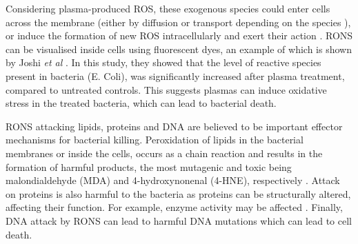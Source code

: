\documentclass[11pt, oneside]{article}   	%
\begin{document}
%
Considering plasma-produced ROS, these exogenous species could enter cells across the membrane (either by diffusion or transport depending on the species \cite{Bienert2006membrane}), or induce the formation of new ROS intracellularly and exert their action \cite{Haertel2014nonthermal}.
RONS can be visualised inside cells using fluorescent dyes, an example of which is shown by Joshi \textit{et al} \cite{Joshi2011nonthermal}.
In this study, they showed that the level of reactive species present in bacteria (E. Coli), was significantly increased after plasma treatment, compared to untreated controls.
This suggests plasmas can induce oxidative stress in the treated bacteria, which can lead to bacterial death.

RONS attacking lipids, proteins and DNA are believed to be important effector mechanisms for bacterial killing.
Peroxidation of lipids in the bacterial membranes or inside the cells, occurs as a chain reaction and results in the formation of harmful products, the most mutagenic and toxic being malondialdehyde (MDA) and 4-hydroxynonenal (4-HNE), respectively \cite{Ayala2014lipid}.
Attack on proteins is also harmful to the bacteria as proteins can be structurally altered, affecting their function.
For example, enzyme activity may be affected \cite{PhamHuy2008free}.
Finally, DNA attack by RONS can lead to harmful DNA mutations which can lead to cell death.
\end{document}

